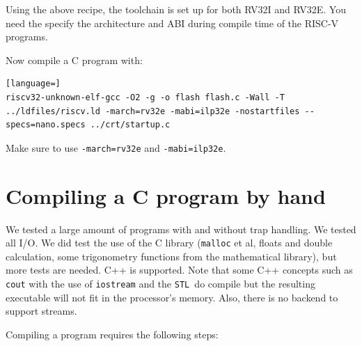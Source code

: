 \documentclass[12pt]{article}
\begin{document}
Using the above recipe, the toolchain is set up for both RV32I and RV32E. You need the specify the architecture and ABI during compile time of the RISC-V programs.

Now compile a C program with:

\begin{lstlisting}[language=]
riscv32-unknown-elf-gcc -O2 -g -o flash flash.c -Wall -T ../ldfiles/riscv.ld -march=rv32e -mabi=ilp32e -nostartfiles --specs=nano.specs ../crt/startup.c
\end{lstlisting}

Make sure to use \texttt{-march=rv32e} and \texttt{-mabi=ilp32e}.


\section{Compiling a C program by hand}
We tested a large amount of programs with and without trap handling. We tested all I/O. We did test the use of the C library (\texttt{malloc} et al, floats and double calculation, some trigonometry functions from the mathematical library), but more tests are needed. C++ is supported. Note that some C++ concepts such as \texttt{cout} with the use of \texttt{iostream} and the \texttt{STL }do compile but the resulting executable will not fit in the processor's memory. Also, there is no backend to support streams.

Compiling a program requires the following steps:
\end{document}
